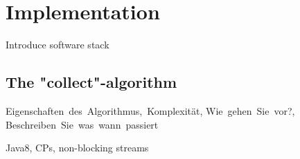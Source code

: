 \chapter{Implementation}

Introduce software stack

\section{The "collect"-algorithm}

Eigenschaften des Algorithmus, Komplexität, Wie gehen Sie vor?, Beschreiben Sie was wann passiert

Java8, CPs, non-blocking streams